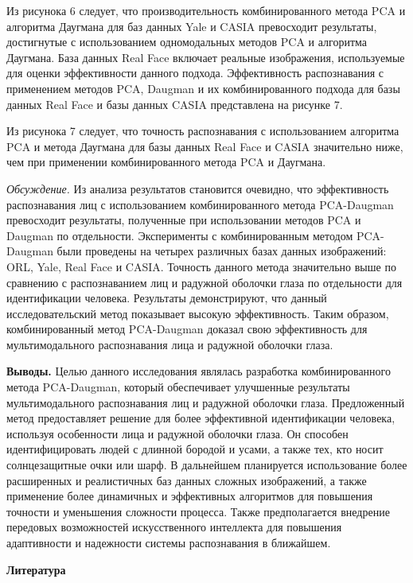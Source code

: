 \begin{multicols}{2}
Из рисунока 6 следует, что производительность комбинированного метода
PCA и алгоритма Даугмана для баз данных Yale и CASIA превосходит
результаты, достигнутые с использованием одномодальных методов PCA и
алгоритма Даугмана. База данных Real Face включает реальные изображения,
используемые для оценки эффективности данного подхода. Эффективность
распознавания с применением методов PCA, Daugman и их комбинированного
подхода для базы данных Real Face и базы данных CASIA представлена на
рисунке 7.

Из рисунока 7 следует, что точность распознавания с использованием
алгоритма PCA и метода Даугмана для базы данных Real Face и CASIA
значительно ниже, чем при применении комбинированного метода PCA и
Даугмана.

\emph{Обсуждение.} Из анализа результатов становится очевидно, что
эффективность распознавания лиц с использованием комбинированного метода
PCA-Daugman превосходит результаты, полученные при использовании методов
PCA и Daugman по отдельности. Эксперименты с комбинированным методом
PCA-Daugman были проведены на четырех различных базах данных
изображений: ORL, Yale, Real Face и CASIA. Точность данного метода
значительно выше по сравнению с распознаванием лиц и радужной оболочки
глаза по отдельности для идентификации человека. Результаты
демонстрируют, что данный исследовательский метод показывает высокую
эффективность. Таким образом, комбинированный метод PCA-Daugman доказал
свою эффективность для мультимодального распознавания лица и радужной
оболочки глаза.

{\bfseries Выводы.} Целью данного исследования являлась разработка
комбинированного метода PCA-Daugman, который обеспечивает улучшенные
результаты мультимодального распознавания лиц и радужной оболочки глаза.
Предложенный метод предоставляет решение для более эффективной
идентификации человека, используя особенности лица и радужной оболочки
глаза. Он способен идентифицировать людей с длинной бородой и усами, а
также тех, кто носит солнцезащитные очки или шарф. В дальнейшем
планируется использование более расширенных и реалистичных баз данных
сложных изображений, а также применение более динамичных и эффективных
алгоритмов для повышения точности и уменьшения сложности процесса. Также
предполагается внедрение передовых возможностей искусственного
интеллекта для повышения адаптивности и надежности системы распознавания
в ближайшем.
\end{multicols}

\begin{center}
{\bfseries Литература}
\end{center}

